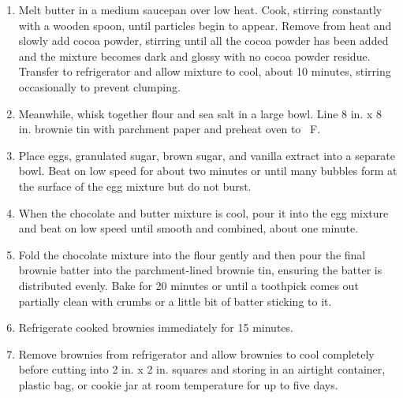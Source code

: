 \documentclass[letterpaper]{tufte-handout}
\begin{document}
\begin{enumerate}	
	\item Melt butter in a medium saucepan over low heat. Cook, stirring constantly with a wooden spoon, until particles begin to appear. Remove from heat and slowly add cocoa powder, stirring until all the cocoa powder has been added and the mixture becomes dark and glossy with no cocoa powder residue. Transfer to refrigerator and allow mixture to cool, about 10 minutes, stirring occasionally to prevent clumping.
	
	\item Meanwhile, whisk together flour and sea salt in a large bowl. Line 8 in. x 8 in. brownie tin with parchment paper and preheat oven to \unit[325]{\textdegree F}.
	
	\item Place eggs, granulated sugar, brown sugar, and vanilla extract into a separate bowl. Beat on low speed for about two minutes or until many bubbles form at the surface of the egg mixture but do not burst.
	
	\item When the chocolate and butter mixture is cool, pour it into the egg mixture and beat on low speed until smooth and combined, about one minute.
	
	\item Fold the chocolate mixture into the flour gently and then pour the final brownie batter into the parchment-lined brownie tin, ensuring the batter is distributed evenly. Bake for 20 minutes or until a toothpick comes out partially clean with crumbs or a little bit of batter sticking to it.
	
	\item Refrigerate cooked brownies immediately for 15 minutes.
	
	\item Remove brownies from refrigerator and allow brownies to cool completely before cutting into 2 in. x 2 in. squares and storing in an airtight container, plastic bag, or cookie jar at room temperature for up to five days.
\end{enumerate}

%
%
\end{document}
